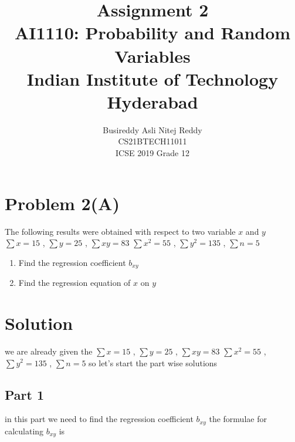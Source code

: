 \documentclass[journal,12pt,twocolumn]{IEEEtran}
\begin{document}
\title{Assignment 2 \\ \Large AI1110: Probability and Random Variables \\ \large Indian Institute of Technology Hyderabad}
\author{Busireddy Asli Nitej Reddy\\ \normalsize CS21BTECH11011  \\ \Large ICSE 2019 Grade 12}
\date{}
\maketitle


\begin{flushleft}

\section*{\textbf{Problem 2(A)}}
The following results were obtained with respect to two variable $x$ and $y$
       \newline
       $\sum x = 15$ , $\sum y = 25$ , $\sum xy = 83$
       \newline
       $\sum x^{2} = 55$ , $\sum y^{2} = 135$ , $\sum n = 5$
       
      \begin{enumerate}
         \item Find the regression coefficient $b_{xy}$
         \item Find the regression equation of $x$ on $y$
      \end{enumerate}



\section*{\textbf{Solution}}
   we are already given the 
       \newline
          $\sum x = 15$ , $\sum y = 25$ , $\sum xy = 83$
      \newline
          $\sum x^{2} = 55$ , $\sum y^{2} = 135$ , $\sum n = 5$
      \newline
   so let's start the part wise solutions
  
  
  
\subsection*{\textbf{Part 1}}
   in this part we need to find the regression coefficient $b_{xy}$
   \newline
   the formulae for calculating $b_{xy}$ is
   

\end{flushleft}
\end{document}
